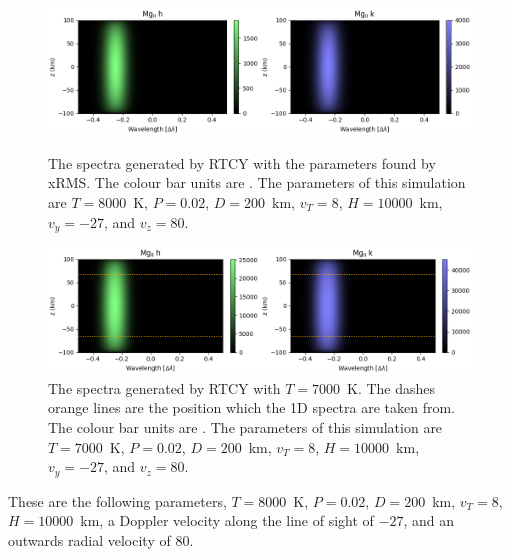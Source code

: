 \begin{figure}[h]
    \centering
    \includegraphics[width=\linewidth]{./03Modelling2D/figs/invert/test1.png}
    \caption[The \mgiihk{} spectra generated by RTCY with the parameters found by xRMS.]{The \mgiihk{} spectra generated by RTCY with the parameters found by xRMS. The colour bar units are \cgsint. The parameters of this simulation are $T=8000$~K, $P=0.02$\dyncm, $D=200$~km, $v_T=8$\kms, $H=10000$~km, $v_y=-27$\kms{}, and $v_z=80$\kms.}
    \label{prom2d} \vspace{20pt}
    \includegraphics[width=\linewidth]{./03Modelling2D/figs/invert/good.png}
    \caption[The \mgiihk{} spectra generated by RTCY with $T=7000$~K.]{The \mgiihk{} spectra generated by RTCY with $T=7000$~K. The dashes orange lines are the position which the 1D spectra are taken from. The colour bar units are \cgsint. The parameters of this simulation are $T=7000$~K, $P=0.02$\dyncm, $D=200$~km, $v_T=8$\kms, $H=10000$~km, $v_y=-27$\kms{}, and $v_z=80$\kms.}
    \label{prom7k}
\end{figure}
These are the following parameters, $T=8000$~K, $P=0.02$\dyncm, $D=200$~km, $v_T=8$\kms, $H=10000$~km, a Doppler velocity along the line of sight of $-27$\kms, and an outwards radial velocity of 80\kms.  
